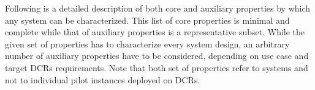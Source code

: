 \documentclass{sig-alternate}
\begin{document}
Following is a detailed description of both core and auxiliary properties by
which any \pilot system can be characterized. This list of core properties is
minimal and complete while that of auxiliary properties is a representative
subset. While the given set of properties has to characterize every \pilot
system design, an arbitrary number of auxiliary properties have to be
considered, depending on use case and target DCRs requirements. Note that both
set of properties refer to \pilot systems and not to individual pilot instances
deployed on DCRs.






\end{document}
